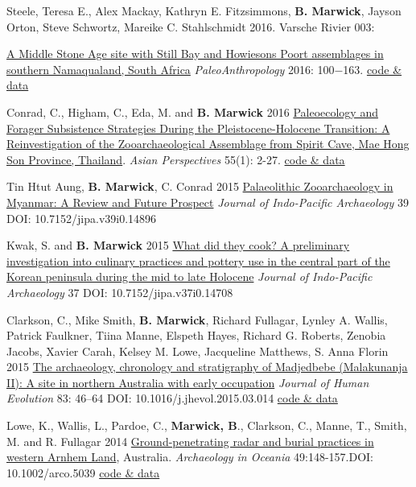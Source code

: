 \documentclass[11pt,article,oneside]{memoir}
\begin{document}
{{{\ind Steele, Teresa E., Alex Mackay, Kathryn E. Fitzsimmons,  \textbf{B. Marwick}, Jayson Orton, Steve Schwortz, Mareike C. Stahlschmidt 2016. Varsche Rivier 003:  {\href{http://www.paleoanthro.org/media/journal/content/PA20160100.pdf}{A Middle Stone Age site with Still Bay and Howiesons Poort assemblages in southern Namaqualand, South Africa} \textit{PaleoAnthropology} 2016: 100−163. \href{https://github.com/benmarwick/Steele_et_al_VR003_MSA_Pigments}{code \& data}

\ind Conrad, C., Higham, C., Eda, M. and \textbf{B. Marwick} 2016 \href{https://doi.org/10.1353/asi.2016.0013}{Paleoecology and Forager Subsistence Strategies During the Pleistocene-Holocene Transition: A Reinvestigation of the Zooarchaeological Assemblage from Spirit Cave, Mae Hong Son Province, Thailand}. \textit{Asian Perspectives} 55(1): 2-27. \href{http://hdl.handle.net/1928/26730}{code \& data}

\ind Tin Htut Aung, \textbf{B. Marwick}, C. Conrad 2015 \href{https://journals.lib.washington.edu/index.php/JIPA/article/view/14896}{Palaeolithic Zooarchaeology in Myanmar: A Review and Future Prospect} \textit{Journal of Indo-Pacific Archaeology} 39 DOI: 10.7152/jipa.v39i0.14896

\ind Kwak, S. and \textbf{B. Marwick} 2015 \href{http://journals.lib.washington.edu/index.php/JIPA/article/view/14708}{What did they cook? A preliminary investigation into culinary practices and pottery use in the central part of the Korean peninsula during the mid to late Holocene} \textit{Journal of Indo-Pacific Archaeology} 37  DOI: 10.7152/jipa.v37i0.14708

\ind Clarkson, C., Mike Smith, \textbf{B. Marwick}, Richard Fullagar, Lynley A. Wallis, Patrick Faulkner, Tiina Manne, Elspeth Hayes, Richard G. Roberts, Zenobia Jacobs, Xavier Carah, Kelsey M. Lowe, Jacqueline Matthews, S. Anna Florin 2015 \href{http://www.sciencedirect.com/science/article/pii/S0047248415000846}{The archaeology, chronology and stratigraphy of Madjedbebe (Malakunanja II): A site in northern Australia with early occupation} \textit{Journal of Human Evolution} 83: 46–64 DOI: 10.1016/j.jhevol.2015.03.014 \href{https://github.com/benmarwick/1989-excavation-report-Madjebebe}{code \& data}

\ind Lowe, K., Wallis, L., Pardoe, C., \textbf{Marwick, B}., Clarkson, C., Manne, T., Smith, M. and R. Fullagar 2014 \href{http://faculty.washington.edu/bmarwick/PDFs/Lowe_et_al_2014_MJB_GPR.pdf}{Ground-penetrating radar and burial practices in western Arnhem Land}, Australia. \textit{Archaeology in Oceania} 49:148-157.\newline  DOI: 10.1002/arco.5039 \href{https://github.com/benmarwick/Rocks-and-burials-at-Madjebebe}{code \& data}

}}}}
\end{document}
